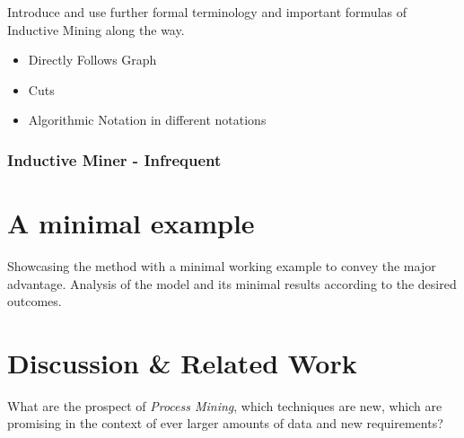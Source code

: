 \documentclass[a4paper]{IEEEtran}
\begin{document}
Introduce and use further formal terminology and important formulas of Inductive Mining along the way. 
\begin{itemize}
    \item Directly Follows Graph
    \item Cuts 
    \item Algorithmic Notation in different notations
\end{itemize}

\subsubsection{Inductive Miner - Infrequent} %
\label{ssub:inductive_miner_infrequent}


\section{A minimal example}
\label{sec:example}
Showcasing the method with a minimal working example to convey the major advantage. Analysis of the model and its minimal results according to the desired outcomes. 


\section{Discussion \& Related Work}
What are the prospect of \textit{Process Mining}, which techniques are new, which are promising in the context of ever larger amounts of data and new requirements?



\end{document}
